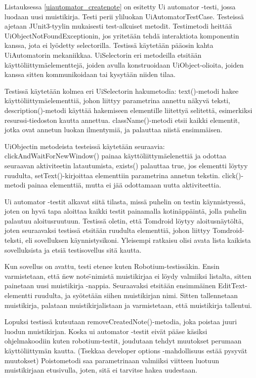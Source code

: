 Listauksessa \ref{uiautomator_createnote} on esitetty Ui automator -testi, jossa luodaan uusi muistikirja. Testi perii yliluokan UiAutomatorTestCase. Testeissä ajetaan JUnit3-tyylin mukaisesti test-alkuiset metodit. Testimetodi heittää UiObjectNotFoundExceptionin, jos yritetään tehdä interaktiota komponentin kanssa, jota ei lyödetty selectorilla. Testissä käytetään pääosin kahta UiAutomatorin mekaniikkaa. UiSelectorin eri metodeilla etsitään käyttöliittymäelementtejä, joiden avulla konstruoidaan UiObject-olioita, joiden kanssa sitten kommunikoidaan tai kysytään niiden tilaa. 

Testissä käytetään kolmea eri UiSelectorin hakumetodia: text()-metodi hakee käyttöliittymäelementtiä, johon liittyy parametrina annettu näkyvä teksti, description()-metodi käyttää hakemiseen elementille liitettyä selitettä, esimerkiksi resurssi-tiedoston kautta annettua. className()-metodi etsii kaikki elementit, jotka ovat annetun luokan ilmentymiä, ja palauttaa niistä ensimmäisen.

UiObjectin metodeista testeissä käytetään seuraavia: clickAndWaitForNewWindow() painaa käyttöliittymäelenettiä ja odottaa seuraavan aktiviteetin latautumista, exists() palauttaa true, jos elementti löytyy ruudulta, setText()-kirjoittaa elementtiin parametrina annetun tekstin. click()-metodi painaa elementtiä, mutta ei jää odottamaan uutta aktiviteettia.

Ui automator -testit alkavat siitä tilasta, missä puhelin on testin käynnistyessä, joten on hyvä tapa aloittaa kaikki testit painamalla kotinäppäintä, jolla puhelin palautuu aloitusruutuun. Testissä oletin, että Tomdroid löytyy aloitusnäytöltä, joten seuraavaksi testissä etsitään ruudulta elementtiä, johon liittyy Tomdroid-teksti, eli sovelluksen käynnistysikoni. Yleisempi ratkaisu olisi avata lista kaikista sovelluksista ja etsiä testisovellus sitä kautta.

Kun sovellus on avattu, testi etenee kuten Robotium-testissäkin. Ensin varmistetaan, että \"new note\"-nimistä muistikirjaa ei löydy valmiiksi listalta, sitten painetaan uusi muistikirja -nappia. Seuraavaksi etsitään ensimmäinen EditText-elementti ruudulta, ja syötetään siihen muistikirjan nimi. Sitten tallennetaan muistikirja, palataan muistikirjalistaan ja varmistetaan, että muistikirja tallentui.

Lopuksi testissä kutsutaan removeCreatedNote()-metodia, joka poistaa juuri luodun muistikirjan. Koska ui automator -testit eivät pääse käsiksi ohjelmakoodiin kuten robotium-testit, joudutaan tehdyt muutokset perumaan käyttöliittymän kautta. (Tsekkaa developer options -mahdollisuus estää pysyvät muutokset) Poistometodi saa parametrinaan valmiiksi viitteen luotuun muistikirjaan etusivulla, joten, sitä ei tarvitse hakea uudestaan.


